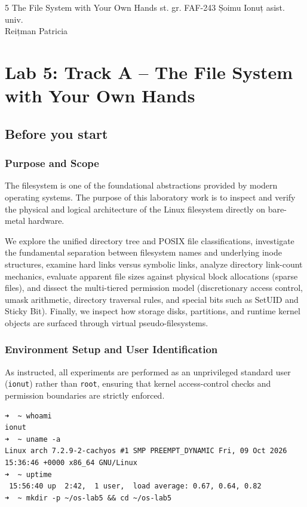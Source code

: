 \documentclass{labreport}
\begin{document}
\labtitle
    {5}
    {The File System with Your Own Hands}
    {st. gr. FAF-243}
    {Șoimu Ionuț}
    {asist. univ.\\[0.15cm] Reițman Patricia}

\tableofcontents
\newpage

\section{Lab 5: Track A -- The File System with Your Own Hands}

\subsection{Before you start}

\subsubsection*{Purpose and Scope}
The filesystem is one of the foundational abstractions provided by modern operating systems. The purpose of this laboratory work is to inspect and verify the physical and logical architecture of the Linux filesystem directly on bare-metal hardware. 

We explore the unified directory tree and POSIX file classifications, investigate the fundamental separation between filesystem names and underlying inode structures, examine hard links versus symbolic links, analyze directory link-count mechanics, evaluate apparent file sizes against physical block allocations (sparse files), and dissect the multi-tiered permission model (discretionary access control, umask arithmetic, directory traversal rules, and special bits such as SetUID and Sticky Bit). Finally, we inspect how storage disks, partitions, and runtime kernel objects are surfaced through virtual pseudo-filesystems.

\subsubsection*{Environment Setup and User Identification}
As instructed, all experiments are performed as an unprivileged standard user (\texttt{ionut}) rather than \texttt{root}, ensuring that kernel access-control checks and permission boundaries are strictly enforced.

\begin{lstlisting}[style=bash]
➜  ~ whoami
ionut
➜  ~ uname -a
Linux arch 7.2.9-2-cachyos #1 SMP PREEMPT_DYNAMIC Fri, 09 Oct 2026 15:36:46 +0000 x86_64 GNU/Linux
➜  ~ uptime
 15:56:40 up  2:42,  1 user,  load average: 0.67, 0.64, 0.82
➜  ~ mkdir -p ~/os-lab5 && cd ~/os-lab5
\end{lstlisting}
\end{document}
